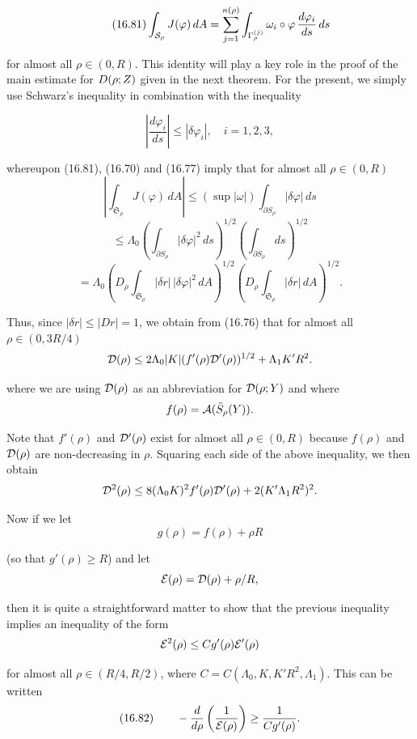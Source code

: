 \begin{equation}\tag{16.81}
\int_{\mathcal{S}_{\rho}} J(\varphi)\, dA
=
\sum_{j=1}^{n(\rho)}
\int_{\Gamma_{\rho}^{(j)}} \omega_i \circ \varphi \,\frac{d\varphi_i}{ds}\, ds
\end{equation}

for almost all $\rho \in (0,R)$. This identity will play a key role in the proof of the main
estimate for $D(\rho; Z)$ given in the next theorem. For the present, we simply use
Schwarz's inequality in combination with the inequality

\[
\left|\frac{d\varphi_i}{ds}\right| \le |\delta \varphi_i|,\quad i=1,2,3,
\]



whereupon (16.81), (16.70) and (16.77) imply that for almost all $\rho \in (0,R)$
\[
\left|\int_{\mathfrak{S}_\rho} J(\varphi)\,dA\right|
\leq \left(\sup |\omega|\right)\int_{\partial S_\rho} |\delta\varphi|\,ds
\]
\[
\leq \Lambda_0\left(\int_{\partial S_\rho} |\delta\varphi|^2\,ds\right)^{1/2}
\left(\int_{\partial S_\rho} ds\right)^{1/2}
\]
\[
=\Lambda_0\left(D_\rho\int_{\mathfrak{S}_\rho} |\delta r|\,|\delta\varphi|^2\,dA\right)^{1/2}
\left(D_\rho\int_{\mathfrak{S}_\rho} |\delta r|\,dA\right)^{1/2}.
\]

Thus, since $|\delta r|\leq |Dr|=1$, we obtain from (16.76) that for almost all $\rho \in (0,3R/4)$
\[
\mathcal{D}(\rho)\leq 2\Lambda_0|K|(f'(\rho)\mathcal{D}'(\rho))^{1/2}+\Lambda_1K'R^2.
\]

where we are using $\mathcal{D}(\rho)$ as an abbreviation for $\mathcal{D}(\rho;Y)$ and where
\[
f(\rho)=\mathcal{A}(\tilde S_\rho(Y)).
\]

Note that $f'(\rho)$ and $\mathcal{D}'(\rho)$ exist for almost all $\rho\in(0,R)$ because $f(\rho)$ and $\mathcal{D}(\rho)$ are non-decreasing in $\rho$. Squaring each side of the above inequality, we then obtain
\[
\mathcal{D}^2(\rho)\leq 8(\Lambda_0 K)^2f'(\rho)\mathcal{D}'(\rho)+2(K'\Lambda_1R^2)^2.
\]

Now if we let
\[
g(\rho)=f(\rho)+\rho R
\]

(so that $g'(\rho)\geq R$) and let
\[
\mathcal{E}(\rho)=\mathcal{D}(\rho)+\rho/R,
\]

then it is quite a straightforward matter to show that the previous inequality implies an inequality of the form
\[
\mathcal{E}^2(\rho)\leq Cg'(\rho)\mathcal{E}'(\rho)
\]

for almost all $\rho\in(R/4,R/2)$, where $C=C(\Lambda_0,K,K'R^2,\Lambda_1)$. This can be written
\[
(16.82)\qquad -\frac{d}{d\rho}\left(\frac{1}{\mathcal{E}(\rho)}\right)\geq \frac{1}{Cg'(\rho)}.
\]


